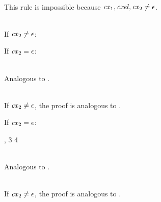 \begin{bycase}

\Case{\Rcxmt}\\
This rule is impossible because $\mathit{cx}_1,\mathit{cxel},\mathit{cx}_2\neq\epsilon$.

\Case{\Rcxtdec}\\
If $\mathit{cx}_2\neq\epsilon$:
\begin{derivation}
\end{derivation}

If $\mathit{cx}_2=\epsilon$:
\begin{derivation}
\end{derivation}

\Case{\Rcxtvdec}\\
Analogous to \Rcxtdec.

\Case{\Rcxodec}\\
If $\mathit{cx}_2\neq\epsilon$, the proof is analogous to \Rcxtdec.

If $\mathit{cx}_2=\epsilon$:
\begin{derivation}
\steP{\EXISTS{\onam,\tvarS,\typ}{\cxel=\odecO}}
     {\indhyp, 3}
     {4}
\end{derivation}

\Case{\Rcxtdef, \Rcxax, \Rcxlem}\\
Analogous to \Rcxodec.

\Case{\Rcxvdec}\\
If $\mathit{cx}_2\neq\epsilon$, the proof is analogous to \Rcxtdec.


\end{bycase}
